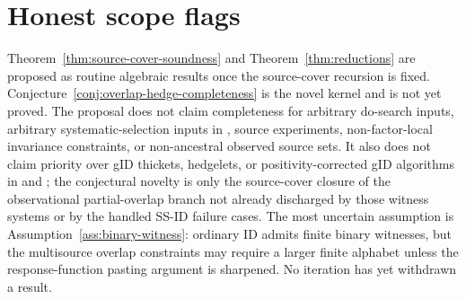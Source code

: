 \documentclass[11pt]{article}
\theoremstyle{definition}
\theoremstyle{plain}
\theoremstyle{remark}
\begin{document}
\section{Honest scope flags}
Theorem~\ref{thm:source-cover-soundness} and
Theorem~\ref{thm:reductions} are proposed as routine algebraic results once
the source-cover recursion is fixed.  Conjecture~\ref{conj:overlap-hedge-completeness}
is the novel kernel and is not yet proved.  The proposal does not claim
completeness for arbitrary do-search inputs, arbitrary systematic-selection
inputs in \citet{LeeGhassamiShpitser2024DataFusionSelection}, source
experiments, non-factor-local invariance constraints, or non-ancestral
observed source sets.  It also does not claim priority over gID thickets,
hedgelets, or positivity-corrected gID algorithms in
\citet{LeeCorreaBareinboim2020GID} and
\citet{KivvaMokhtarianEtesamiKiyavash2022RevisitGID}; the conjectural novelty
is only the source-cover closure of the observational partial-overlap branch
not already discharged by those witness systems or by the handled SS-ID
failure cases.  The most uncertain assumption is
Assumption~\ref{ass:binary-witness}:
ordinary ID admits finite binary witnesses, but the multisource overlap
constraints may require a larger finite alphabet unless the response-function
pasting argument is sharpened.  No iteration has yet withdrawn a result.
\end{document}
